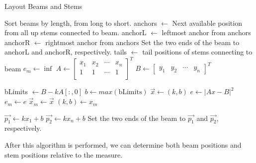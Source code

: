 \begin{algorithm}
    \caption{Layout Beams and Stems} \label{algo:layout-beams}
    \begin{algorithmic}[1]
        \State Sort beams by length, from long to short.
            \State anchors $\gets$ Next available position from all up stems connected to beam.
                \State anchorL $\gets$ leftmost anchor from anchors
                \State anchorR $\gets$ rightmost anchor from anchors
                \State Set the two ends of the beam to anchorL and anchorR, respectively.
            \Else
                \State tails $\gets$ tail positions of stems connecting to beam
                \State $e_m \gets \inf $ 
                \State $ A \gets \left[\begin{array}{cccc}
                        x_1 & x_2 & \cdots & x_n \\
                        1 & 1 & \cdots & 1 \\
                    \end{array}\right]^T$
                \State $ B \gets \left[\begin{array}{cccc} 
                        y_1 & y_2 & \cdots & y_n 
                    \end{array}\right]^T$

                    \State bLimits $\gets B - k A[:, 0]$
                    \State $ b \gets max(\mathrm{bLimits}) $
                    \State $ \vec{x} \gets (k, b) $
                    \State $ e \gets \left|Ax - B \right|^2 $
                        \State $e_m \gets e$
                        \State $\vec{x}_m \gets \vec{x} $
                    \EndIf
                \EndFor
                \State $(k, b) \gets x_m$

                \State $\vec{p_1} \gets k x_1 + b $
                \State $\vec{p_2} \gets k x_n + b $
                \State Set the two ends of the beam to $\vec{p_1}$ and $\vec{p_2}$, respectively.
            \EndIf
        \EndFor
        
    \end{algorithmic}
\end{algorithm}

After this algorithm is performed, we can determine both beam positions and stem positions relative to the measure.

